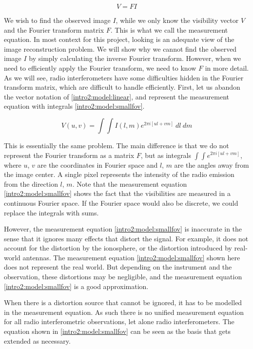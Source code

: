 \begin{equation}\label{intro2:model:linear}
V = F I
\end{equation}

We wish to find the observed image $I$, while we only know the visibility vector $V$ and the Fourier transform matrix $F$. This is what we call the measurement equation. In most context for this project, looking is an adequate view of the image reconstruction problem. We will show why we cannot find the observed image $I$ by simply calculating the inverse Fourier transform. However, when we need to efficiently apply the Fourier transform, we need to know $F$ in more detail. As we will see, radio interferometers have some difficulties hidden in the Fourier transform matrix, which are difficult to handle efficiently. First, let us abandon the vector notation of \eqref{intro2:model:linear}, and represent the measurement equation with integrals \eqref{intro2:model:smallfov}.

\begin{equation}\label{intro2:model:smallfov}
V(u, v) = \int\int I(l, m)  e^{2 \pi i [ul+vm]} \: dl \: dm
\end{equation}

This is essentially the same problem. The main difference is that we do not represent the Fourier transform as a matrix $F$, but as integrals $\int\int e^{2 \pi i [ul+vm]}$, where $u$, $v$ are the coordinates in Fourier space and $l$, $m$ are the angles away from the image center. A single pixel represents the intensity of the radio emission from the direction $l$, $m$. Note that the measurement equation \eqref{intro2:model:smallfov} shows the fact that the visibilities are measured in a continuous Fourier space. If the Fourier space would also be discrete, we could replace the integrals with sums.

However, the measurement equation \eqref{intro2:model:smallfov} is inaccurate in the sense that it ignores many effects that distort the signal. For example, it does not account for the distortion by the ionosphere, or the distortion introduced by real-world antennas. The measurement equation \eqref{intro2:model:smallfov} shown here does not represent the real world. But depending on the instrument and the observation, these distortions may be negligible, and the measurement equation \eqref{intro2:model:smallfov} is a good approximation. 

When there is a distortion source that cannot be ignored, it has to be modelled in the measurement equation. As such there is no unified measurement equation for all radio interferometric observations, let alone radio interferometers. The equation shown in \eqref{intro2:model:smallfov} can be seen as the basis that gets extended as necessary\cite{smirnov2011revisiting1, smirnov2011revisiting2, smirnov2011revisiting3, smirnov2011revisiting4}.

